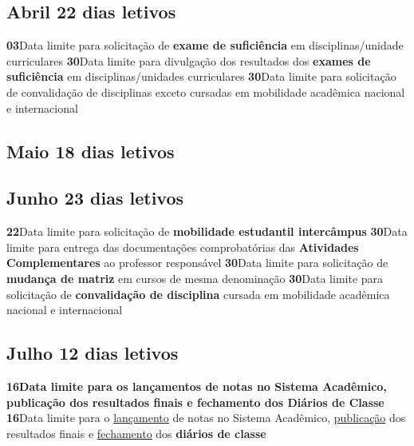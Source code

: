 \documentclass[thesis]{hmcposter}
\begin{document}
\begin{poster}
\subsection{Abril \hfill 22 dias letivos}\textbf{03}\qquad Data limite para solicitação de \textbf{exame de suficiência} em disciplinas/unidade curriculares \newline \null\textbf{30}\qquad Data limite para divulgação dos resultados dos \textbf{exames de suficiência} em disciplinas/unidades curriculares \newline \null\textbf{30}\qquad Data limite para solicitação de convalidação de disciplinas exceto cursadas em mobilidade acadêmica nacional e internacional \newline \null\subsection{Maio \hfill 18 dias letivos}\subsection{Junho \hfill 23 dias letivos}\textbf{22}\qquad Data limite para solicitação de \textbf{mobilidade estudantil intercâmpus} \newline \null\textbf{30}\qquad Data limite para entrega das documentações comprobatórias das \textbf{Atividades Complementares} ao professor responsável \newline \null\textbf{30}\qquad Data limite para solicitação de \textbf{mudança de matriz} em cursos de mesma denominação \newline \null\textbf{30}\qquad Data limite para solicitação de \textbf{convalidação de disciplina} cursada em mobilidade acadêmica nacional e internacional \newline \null\subsection{Julho \hfill 12 dias letivos}\textbf{16}\qquad \textbf{Data limite para os lançamentos de notas no Sistema Acadêmico, publicação dos resultados finais e fechamento dos Diários de Classe} \newline \null\textbf{16}\qquad Data limite para o \underline{lançamento} de notas no Sistema Acadêmico, \underline{publicação} dos resultados finais e \underline{fechamento} dos \textbf{diários de classe} \newline \null\newpage

\end{poster}
\end{document}
